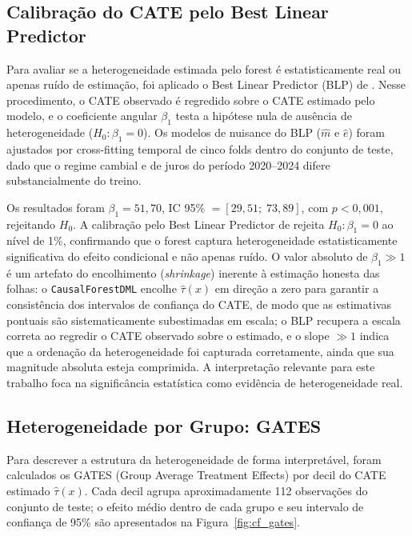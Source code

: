 \documentclass[	12pt, Times, openright, oneside, a4paper, english, brazil]{abntex2}
\begin{document}
\subsection{Calibração do CATE pelo Best Linear Predictor}

Para avaliar se a heterogeneidade estimada pelo forest é estatisticamente real ou apenas ruído de estimação, foi aplicado o Best Linear Predictor (BLP) de . Nesse procedimento, o CATE observado é regredido sobre o CATE estimado pelo modelo, e o coeficiente angular $\beta_1$ testa a hipótese nula de ausência de heterogeneidade ($H_0 : \beta_1 = 0$). Os modelos de nuisance do BLP ($\hat{m}$ e $\hat{e}$) foram ajustados por cross-fitting temporal de cinco folds dentro do conjunto de teste, dado que o regime cambial e de juros do período 2020--2024 difere substancialmente do treino.

Os resultados foram $\beta_1 = 51{,}70$, IC 95\% $= [29{,}51;\; 73{,}89]$, com $p < 0{,}001$, rejeitando $H_0$. A calibração pelo Best Linear Predictor de  rejeita $H_0 : \beta_1 = 0$ ao nível de 1\%, confirmando que o forest captura heterogeneidade estatisticamente significativa do efeito condicional e não apenas ruído. O valor absoluto de $\beta_1 \gg 1$ é um artefato do encolhimento (\textit{shrinkage}) inerente à estimação honesta das folhas: o \texttt{CausalForestDML} encolhe $\hat{\tau}(x)$ em direção a zero para garantir a consistência dos intervalos de confiança do CATE, de modo que as estimativas pontuais são sistematicamente subestimadas em escala; o BLP recupera a escala correta ao regredir o CATE observado sobre o estimado, e o slope $\gg 1$ indica que a ordenação da heterogeneidade foi capturada corretamente, ainda que sua magnitude absoluta esteja comprimida. A interpretação relevante para este trabalho foca na significância estatística como evidência de heterogeneidade real.

\subsection{Heterogeneidade por Grupo: GATES}

Para descrever a estrutura da heterogeneidade de forma interpretável, foram calculados os GATES (Group Average Treatment Effects) por decil do CATE estimado $\hat{\tau}(x)$. Cada decil agrupa aproximadamente 112 observações do conjunto de teste; o efeito médio dentro de cada grupo e seu intervalo de confiança de 95\% são apresentados na Figura~\ref{fig:cf_gates}.
\end{document}
